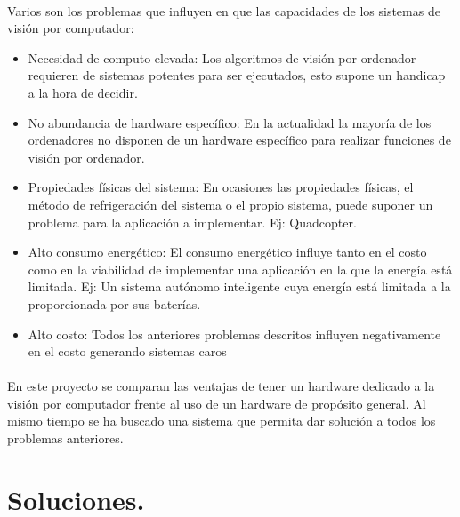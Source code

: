 \documentclass[a4paper,12pt,titlepage,final]{book}
\begin{document}
\paragraph{}
Varios son los problemas que influyen en que las capacidades de los sistemas de
visión por computador:
\begin{itemize}
  \item Necesidad de computo elevada: Los algoritmos de visión por ordenador
  requieren de sistemas potentes para ser ejecutados, esto supone un handicap a la hora de
  decidir.
  \item No abundancia de hardware específico: En la actualidad la mayoría de los
  ordenadores no disponen de un hardware específico para realizar funciones de
  visión por ordenador.
  \item Propiedades físicas del sistema: En ocasiones las propiedades físicas, el
  método de refrigeración del sistema o el propio sistema, puede suponer un problema para
  la aplicación a implementar. Ej: Quadcopter.
  \item Alto consumo energético: El consumo energético influye tanto en el costo
  como en la viabilidad de implementar una aplicación en la que la energía está limitada.
  Ej: Un sistema autónomo inteligente cuya energía está limitada a la
  proporcionada por sus baterías.
  \item Alto costo: Todos los anteriores problemas descritos influyen
  negativamente en el costo generando sistemas caros
\end{itemize}

\paragraph{}
En este proyecto se comparan las ventajas de tener un hardware dedicado a la
visión por computador frente al uso de un hardware de propósito general. Al
mismo tiempo se ha buscado una sistema que permita dar solución a todos los
problemas anteriores.

\section{Soluciones.}
\subsection*{}
\subsubsection*{}
\end{document}
